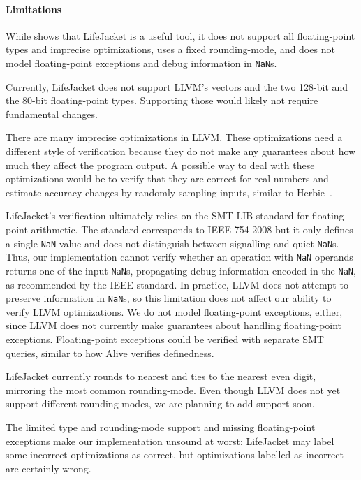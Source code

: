 \documentclass[preprint, numbers]{sigplanconf}
\newcommand{\xxx}{LifeJacket}
\begin{document}
\paragraph{Limitations} While  shows that \xxx{} is a
useful tool, it does not support all floating-point types and imprecise
optimizations, uses a fixed rounding-mode, and does not model floating-point
exceptions and debug information in \texttt{NaN}s.

Currently, \xxx{} does not support LLVM's vectors and
the two 128-bit and the 80-bit floating-point types. Supporting those would
likely not require fundamental changes.

There are many imprecise optimizations in LLVM. These optimizations need a
different style of verification because they do not make any guarantees about
how much they affect the program output. A possible way to deal with these
optimizations would be to verify that they are correct for real numbers and
estimate accuracy changes by randomly sampling inputs,
similar to Herbie~\cite{panchekha2015automatically}.

\xxx{}'s verification ultimately relies on the SMT-LIB standard for
floating-point arithmetic. The standard corresponds to IEEE 754-2008
but it only defines a single \texttt{NaN} value and does
not distinguish between signalling and quiet \texttt{NaN}s. Thus,
our implementation cannot verify whether an operation with \texttt{NaN}
operands returns one of the input \texttt{NaN}s, propagating debug information
encoded in the \texttt{NaN}, as recommended by the IEEE standard. In practice,
LLVM does not attempt to preserve information in \texttt{NaN}s, so this
limitation does not affect our ability to verify LLVM optimizations.  We do not
model floating-point exceptions, either, since LLVM does not currently make
guarantees about handling floating-point exceptions. Floating-point exceptions
could be verified with separate SMT queries, similar to how Alive verifies
definedness.

\xxx{} currently rounds to nearest and ties to the nearest even digit,
mirroring the most common rounding-mode. Even though LLVM does not yet support
different rounding-modes, we are planning to add support soon.

The limited type and rounding-mode support and missing floating-point
exceptions make our implementation unsound at worst: \xxx{} may label some
incorrect optimizations as correct, but optimizations labelled as incorrect are
certainly wrong.
\end{document}

